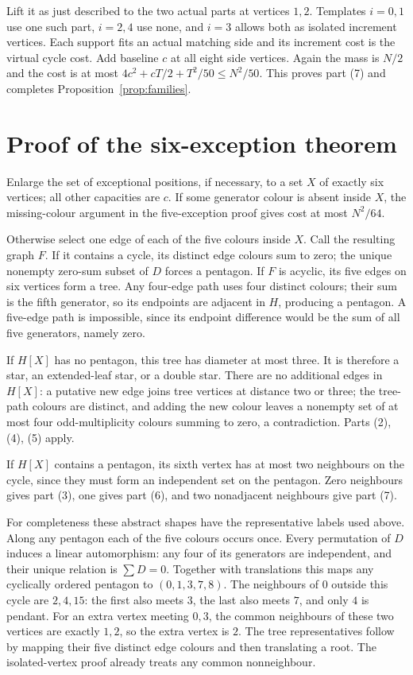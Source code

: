 \documentclass[11pt]{article}
\begin{document}
Lift it as just described to the two actual parts at vertices $1,2$.
Templates $i=0,1$ use one such part, $i=2,4$ use none,
and $i=3$ allows both as isolated increment vertices.
Each support fits an actual matching side and its increment cost is
the virtual cycle cost.
Add baseline $c$ at all eight side vertices.
Again the mass is $N/2$ and the cost is at most
$4c^2+cT/2+T^2/50\leq N^2/50$.
This proves part (7) and completes Proposition~\ref{prop:families}.

\section{Proof of the six-exception theorem}
Enlarge the set of exceptional positions, if necessary, to a set $X$
of exactly six vertices; all other capacities are $c$.
If some generator colour is absent inside $X$, the missing-colour
argument in the five-exception proof gives cost at most $N^2/64$.

Otherwise select one edge of each of the five colours inside $X$.
Call the resulting graph $F$.
If it contains a cycle, its distinct edge colours sum to zero;
the unique nonempty zero-sum subset of $D$ forces a pentagon.
If $F$ is acyclic, its five edges on six vertices form a tree.
Any four-edge path uses four distinct colours; their sum is the fifth
generator, so its endpoints are adjacent in $H$, producing a pentagon.
A five-edge path is impossible, since its endpoint difference would be
the sum of all five generators, namely zero.

If $H[X]$ has no pentagon, this tree has diameter at most three.
It is therefore a star, an extended-leaf star, or a double star.
There are no additional edges in $H[X]$:
a putative new edge joins tree vertices at distance two or three;
the tree-path colours are distinct, and adding the new colour leaves
a nonempty set of at most four odd-multiplicity colours summing to zero,
a contradiction. Parts (2), (4), (5) apply.

If $H[X]$ contains a pentagon, its sixth vertex has at most two neighbours
on the cycle, since they must form an independent set on the pentagon.
Zero neighbours gives part (3), one gives part (6), and two nonadjacent
neighbours give part (7).

For completeness these abstract shapes have the representative labels
used above. Along any pentagon each of the five colours occurs once.
Every permutation of $D$ induces a linear automorphism: any four of its
generators are independent, and their unique relation is $\sum D=0$.
Together with translations this maps any cyclically ordered pentagon
to $(0,1,3,7,8)$.
The neighbours of $0$ outside this cycle are $2,4,15$:
the first also meets $3$, the last also meets $7$, and only $4$ is pendant.
For an extra vertex meeting $0,3$, the common neighbours of these
two vertices are exactly $1,2$, so the extra vertex is $2$.
The tree representatives follow by mapping their five distinct edge
colours and then translating a root.
The isolated-vertex proof already treats any common nonneighbour.
\end{document}
